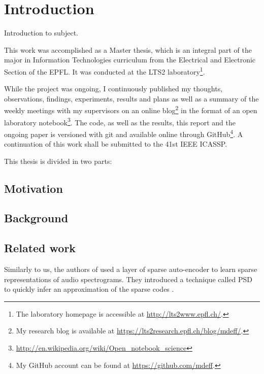 \documentclass[a4paper,12pt,twoside]{report}
\begin{document}
\chapter*{Introduction}

{\color{red} Introduction to subject.}

This work was accomplished as a Master thesis, which is an integral part of the major in Information Technologies curriculum from the Electrical and Electronic Section of the \gls{EPFL}. It was conducted at the LTS2 laboratory\footnote{The laboratory homepage is accessible at \url{http://lts2www.epfl.ch/}.}.

While the project was ongoing, I continuously published my thoughts, observations, findings, experiments, results and plans as well as a summary of the weekly meetings with my supervisors on an online blog\footnote{My research blog is available at \url{https://lts2research.epfl.ch/blog/mdeff/}.} in the format of an open laboratory notebook\footnote{\url{http://en.wikipedia.org/wiki/Open_notebook_science}}. The code, as well as the results, this report and the ongoing paper is versioned with git and available online through GitHub\footnote{My GitHub account can be found at \url{https://github.com/mdeff}.}. A continuation of this work shall be submitted to the 41st IEEE \gls{ICASSP}.

This thesis is divided in two parts: 

\section*{Motivation}

\section*{Background}

\section*{Related work}

Similarly to us, the authors of \cite{lecun2011PSDaudio} used a layer of sparse auto-encoder to learn sparse representations of audio spectrograms. They introduced a technique called \gls{PSD} to quickly infer an approximation of the sparse codes \cite{lecun2010PSD}.
\end{document}
